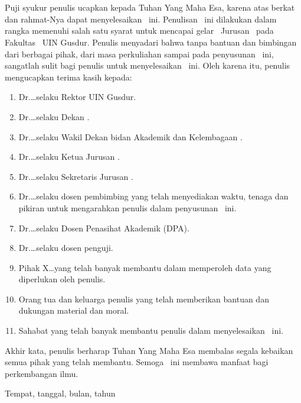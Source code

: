 \chapter*{\kataPengantar}

Puji syukur penulis ucapkan kepada Tuhan Yang Maha Esa, karena atas berkat
dan rahmat-Nya dapat menyelesaikan \type~ini.
Penulisan \type~ini dilakukan dalam rangka memenuhi salah satu syarat untuk
mencapai gelar \gelar~Jurusan \program~pada Fakultas \fakultas~UIN Gusdur.
Penulis menyadari bahwa tanpa bantuan dan bimbingan dari berbagai pihak,
dari masa perkuliahan sampai pada penyusunan \type~ini, sangatlah sulit bagi
penulis untuk menyelesaikan \type~ini.
Oleh karena itu, penulis mengucapkan terima kasih kepada:
\begin{enumerate}[topsep=0pt,itemsep=-1ex,partopsep=1ex,parsep=1ex]
	\item Dr.\ldots selaku Rektor UIN Gusdur.
	\item Dr.\ldots selaku Dekan \fakultas.
	\item Dr.\ldots selaku Wakil Dekan bidan Akademik dan Kelembagaan \fakultas.
	\item Dr.\ldots selaku Ketua Jurusan \program.
	\item Dr.\ldots selaku Sekretaris Jurusan \program.
	\item Dr.\ldots selaku dosen pembimbing yang telah menyediakan waktu, tenaga dan pikiran
	untuk mengarahkan penulis dalam penyusunan \type~ini.
	\item Dr.\ldots selaku Dosen Penasihat Akademik (DPA).
	\item Dr.\ldots selaku dosen penguji.
	\item Pihak X\ldots yang telah banyak membantu dalam memperoleh data yang
	diperlukan oleh penulis.
	\item Orang tua dan keluarga penulis yang telah memberikan bantuan dan
	dukungan material dan moral.
	\item Sahabat yang telah banyak membantu penulis dalam menyelesaikan \type~ini.
\end{enumerate}

Akhir kata, penulis berharap Tuhan Yang Maha Esa membalas segala kebaikan semua
pihak yang telah membantu. Semoga \type~ini membawa manfaat bagi perkembangan
ilmu.\\

\begin{ttdkanan}
 Tempat, tanggal, bulan, tahun\\[3em]

 \noindent\penulis
\end{ttdkanan}


%
